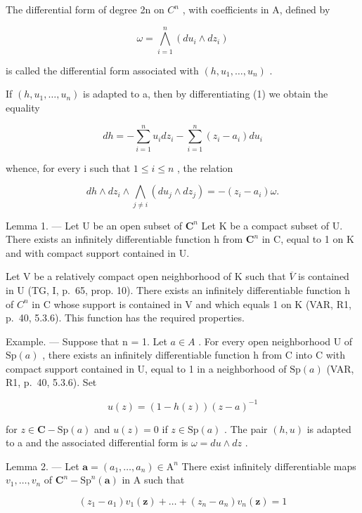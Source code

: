 The differential form of degree 2n on \(C^{n}\) , with coefficients in A, defined by

\[
\omega = \bigwedge_ {i = 1} ^ {n} (d u _ {i} \wedge d z _ {i})
\]

is called the differential form associated with \((h, u_1, \ldots, u_n)\) .

If \((h, u_{1}, \ldots, u_{n})\) is adapted to a, then by differentiating (1) we obtain the equality

\[
d h = - \sum_ {i = 1} ^ {n} u _ {i} d z _ {i} - \sum_ {i = 1} ^ {n} (z _ {i} - a _ {i}) d u _ {i}\tag{2}
\]

whence, for every i such that \(1 \leqslant i \leqslant n\) , the relation

\[
d h \wedge d z _ {i} \wedge \bigwedge_ {j \neq i} (d u _ {j} \wedge d z _ {j}) = - (z _ {i} - a _ {i}) \omega .\tag{3}
\]

Lemma 1. --- Let U be an open subset of \(\mathbf{C}^{n}\) Let K be a compact subset of U. There exists an infinitely differentiable function h from \(\mathbf{C}^{n}\) in C, equal to 1 on K and with compact support contained in U.

Let V be a relatively compact open neighborhood of K such that \(\overline{V}\) is contained in U (TG, I, p.~65, prop. 10). There exists an infinitely differentiable function h of \(C^{n}\) in C whose support is contained in V and which equals 1 on K (VAR, R1, p.~40, 5.3.6). This function has the required properties.

Example. --- Suppose that n = 1. Let \(a \in A\) . For every open neighborhood U of \(\mathrm{Sp}(a)\) , there exists an infinitely differentiable function h from C into C with compact support contained in U, equal to 1 in a neighborhood of \(\mathrm{Sp}(a)\) (VAR, R1, p.~40, 5.3.6). Set

\[
u (z) = (1 - h (z)) (z - a) ^ {- 1}
\]

for \(z \in \mathbf{C} - \mathrm{Sp}(a)\) and \(u(z) = 0\) if \(z \in \mathrm{Sp}(a)\) . The pair \((h, u)\) is adapted to a and the associated differential form is \(\omega = du \wedge dz\) .

Lemma 2. --- Let \(\boldsymbol{a} = (a_{1},\ldots ,a_{n})\in \mathrm{A}^{n}\) There exist infinitely differentiable maps \(v_{1},\ldots ,v_{n}\) of \(\mathbf{C}^n -\mathrm{Sp}^n (\boldsymbol {a})\) in A such that

\[
(z _ {1} - a _ {1}) v _ {1} (\boldsymbol {z}) + \dots + (z _ {n} - a _ {n}) v _ {n} (\boldsymbol {z}) = 1
\]

